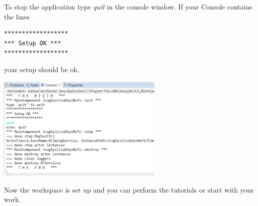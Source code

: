 To stop the application type \emph{quit} in the console window. If your Console contains the lines
\begin{verbatim}
******************
*** Setup OK ***
******************
\end{verbatim}
your setup should be ok.

\includegraphics[width=0.6\textwidth]{images/013-SetupWorkspace07.png} 

Now the workspace is set up and you can perform the tutorials or start with your work.
